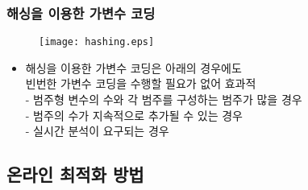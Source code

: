 \documentclass{beamer}
\begin{document}
\begin{frame}
\frametitle{해싱을 이용한 가변수 코딩}

\begin{figure}
	\begin{center}
	\texttt{[image: hashing.eps]} %
    \end{center}
\end{figure}

{\footnotesize
\begin{itemize}

    \item 해싱을 이용한 가변수 코딩은 아래의 경우에도
        \\빈번한 가변수 코딩을 수행할 필요가 없어 효과적
    \\ \quad - 범주형 변수의 수와 각 범주를 구성하는 범주가 많을 경우
    \\ \quad - 범주의 수가 지속적으로 추가될 수 있는 경우
    \\ \quad - 실시간 분석이 요구되는 경우
\end{itemize}

}
\end{frame}





\subsection{온라인 최적화 방법} %
\end{document}
